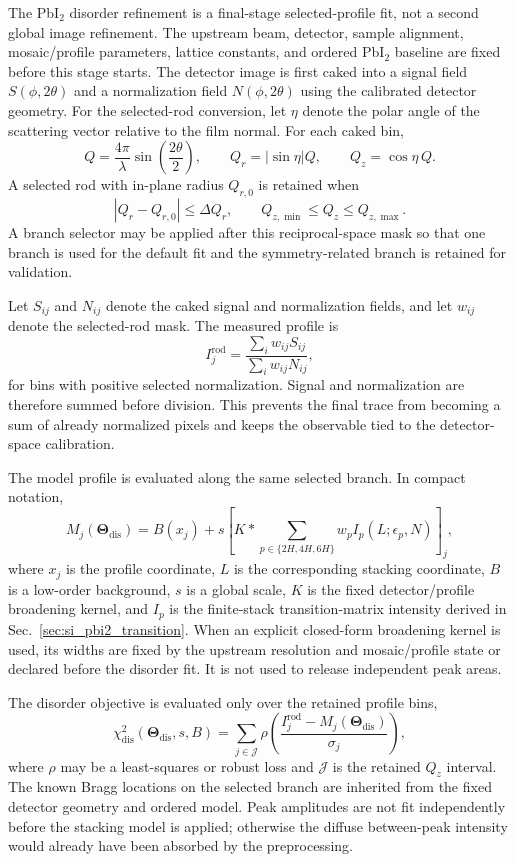 \documentclass[11pt]{article}
\begin{document}
The PbI$_2$ disorder refinement is a final-stage selected-profile fit, not a second global image refinement. The upstream beam, detector, sample alignment, mosaic/profile parameters, lattice constants, and ordered PbI$_2$ baseline are fixed before this stage starts. The detector image is first caked into a signal field $S(\phi,2\theta)$ and a normalization field $N(\phi,2\theta)$ using the calibrated detector geometry. For the selected-rod conversion, let $\eta$ denote the polar angle of the scattering vector relative to the film normal. For each caked bin,
\[
  Q=\frac{4\pi}{\lambda}\sin\!\left(\frac{2\theta}{2}\right),
  \qquad
  Q_r=|\sin\eta|Q,
  \qquad
  Q_z=\cos\eta\,Q.
\]
A selected rod with in-plane radius $Q_{r,0}$ is retained when
\[
  |Q_r-Q_{r,0}|\le \Delta Q_r,
  \qquad
  Q_{z,\min}\le Q_z\le Q_{z,\max}.
\]
A branch selector may be applied after this reciprocal-space mask so that one branch is used for the default fit and the symmetry-related branch is retained for validation.

Let $S_{ij}$ and $N_{ij}$ denote the caked signal and normalization fields, and let $w_{ij}$ denote the selected-rod mask. The measured profile is
\[
  I_j^{\mathrm{rod}}=\frac{\sum_i w_{ij}S_{ij}}{\sum_i w_{ij}N_{ij}},
\]
for bins with positive selected normalization. Signal and normalization are therefore summed before division. This prevents the final trace from becoming a sum of already normalized pixels and keeps the observable tied to the detector-space calibration.

The model profile is evaluated along the same selected branch. In compact notation,
\[
  M_j(\boldsymbol{\Theta}_{\mathrm{dis}})
  =B(x_j)+s\left[K*\sum_{p\in\{2H,4H,6H\}}
  w_p I_p(L;\epsilon_p,N)\right]_j,
\]
where $x_j$ is the profile coordinate, $L$ is the corresponding stacking
coordinate, $B$ is a low-order background, $s$ is a global scale, $K$ is the
fixed detector/profile broadening kernel, and $I_p$ is the finite-stack
transition-matrix intensity derived in
Sec.~\ref{sec:si_pbi2_transition}.  When an explicit closed-form broadening
kernel is used, its widths are fixed by the upstream resolution and
mosaic/profile state or declared before the disorder fit.  It is not used to
release independent peak areas.

The disorder objective is evaluated only over the retained profile bins,
\[
  \chi^2_{\mathrm{dis}}(\boldsymbol{\Theta}_{\mathrm{dis}},s,B)
  =\sum_{j\in\mathcal J}\rho\!\left(
  \frac{I_j^{\mathrm{rod}}-M_j(\boldsymbol{\Theta}_{\mathrm{dis}})}{\sigma_j}
  \right),
\]
where $\rho$ may be a least-squares or robust loss and $\mathcal J$ is the retained $Q_z$ interval. The known Bragg locations on the selected branch are inherited from the fixed detector geometry and ordered model. Peak amplitudes are not fit independently before the stacking model is applied; otherwise the diffuse between-peak intensity would already have been absorbed by the preprocessing.
\end{document}
